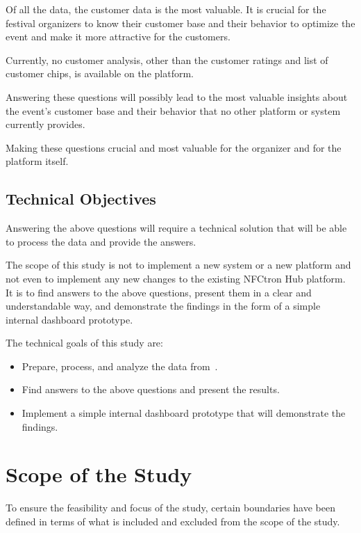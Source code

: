 Of all the data, the customer data is the most valuable.
It is crucial for the festival organizers to know their customer base and their behavior to optimize the event and make it more attractive for the customers.

Currently, no customer analysis, other than the customer ratings and list of customer chips, is available on the platform.

Answering these questions will possibly lead to the most valuable insights about the event's customer base and their behavior that no other platform or system currently provides.

Making these questions crucial and most valuable for the organizer and for the platform itself.

\subsection*{Technical Objectives}
\label{subsec:introduction-objectives-technical}
Answering the above questions will require a technical solution that will be able to process the data and provide the answers.

The scope of this study is not to implement a new system or a new platform and not even to implement any new changes to the existing NFCtron Hub platform.
It is to find answers to the above questions, present them in a clear and understandable way, and demonstrate the findings in the form of a simple internal dashboard prototype.

The technical goals of this study are:
\begin{itemize}
	\item Prepare, process, and analyze the data from~\theEvent.
	\item Find answers to the above questions and present the results.
	\item Implement a simple internal dashboard prototype that will demonstrate the findings.
\end{itemize}

\pagebreak[4]
\section*{Scope of the Study}
\label{sec:introduction-scope}
To ensure the feasibility and focus of the study, certain boundaries have been defined in terms of what is included and excluded from the scope of the study.

